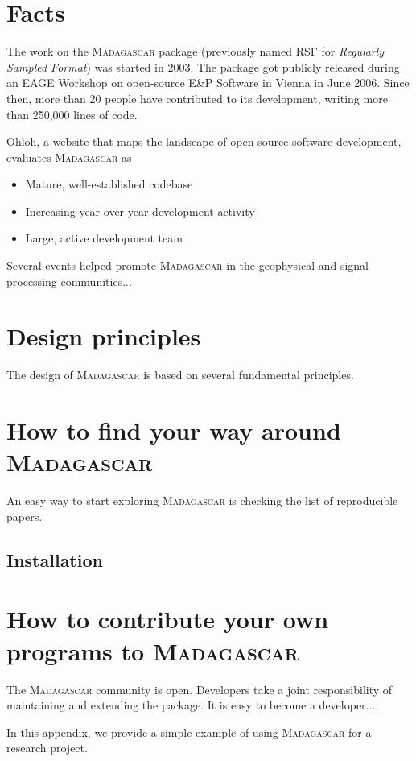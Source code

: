 \section{Facts}

The work on the \textsc{Madagascar} package (previously named RSF for \emph{Regularly
Sampled Format}) was started in 2003.  The package got
publicly released during an EAGE Workshop on open-source E\&P Software
in Vienna in June 2006. Since then, more than 20 people have
contributed to its development, writing more than 250,000 lines of code.

\href{http://www.ohloh.net/}{Ohloh}, a website that maps the landscape
of open-source software development, evaluates \textsc{Madagascar} as
\begin{itemize}
\item Mature, well-established codebase
\item Increasing year-over-year development activity
\item Large, active development team 
\end{itemize}

Several events helped promote \textsc{Madagascar} in the geophysical
and signal processing communities...

\section{Design principles}

The design of \textsc{Madagascar} is based on several fundamental principles.

\section{How to find your way around \textsc{Madagascar}}

An easy way to start exploring \textsc{Madagascar} is checking the list of reproducible papers. 

\subsection{Installation}

\section{How to contribute your own programs to \textsc{Madagascar}}

The \textsc{Madagascar} community is open. Developers take a joint
responsibility of maintaining and extending the package. It is easy to
become a developer....





In this appendix, we provide a simple example of using
\textsc{Madagascar} for a research project.


